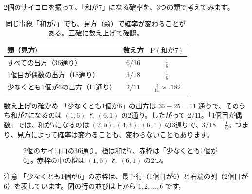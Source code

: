 \documentclass[a4paper,11pt,openany]{ltjsbook}
\newcommand{\Prob}{\mathrm{P}}
\begin{document}
2個のサイコロを振って、「和が7」になる確率を、3つの類で考えてみます。

\begin{table}[htbp]
\centering
\begin{tabular}{lcc}
\toprule
類（見方） & 数え方 & $\Prob(\text{和が7})$\\
\midrule
すべての出方（36通り） & $6/36$ & $\tfrac16$\\
1個目が偶数の出方（18通り） & $3/18$ & $\tfrac16$\\
少なくとも1個が6の出方（11通り） & $2/11$ & $\tfrac{2}{11}\approx.182$\\
\bottomrule
\end{tabular}
\caption{同じ事象「和が7」でも、見方（類）で確率が変わることがある。正確に数え上げて確認。}
\end{table}

\begin{examplebox}{数え上げの確かめ}
「少なくとも1個が6」の出方は $36-25=11$ 通りで、そのうち和が7になるのは $(1,6)$ と $(6,1)$ の2通り。したがって $2/11$。「1個目が偶数」では、和が7になるのは $(2,5),(4,3),(6,1)$ の3通りで、$3/18=\tfrac16$。つまり、見方によって確率は変わることも、変わらないこともあります。
\end{examplebox}

\begin{figure}[htbp]
\centering
{}
\caption{2個のサイコロの36通り。橙は和が7、赤枠は「少なくとも1個が6」。赤枠の中の橙は $(1,6)$ と $(6,1)$ の2つ。}
\end{figure}

\begin{notebox}{注意}
「少なくとも1個が6」の赤枠は、最下行（1個目が6）と右端の列（2個目が6）を表しています。図の行の並びは上から $1,2,\ldots,6$ です。
\end{notebox}
\end{document}
